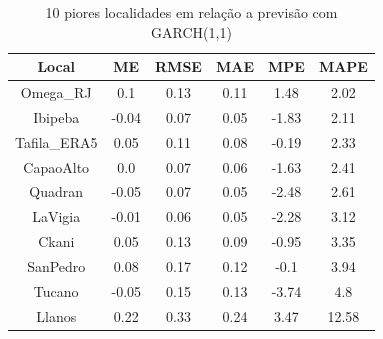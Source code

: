 \documentclass[
	12pt,				%
	openright,			%
	oneside,			%
	a4paper,			%
	english,			%
	french,				%
	spanish,			%
	brazil				%
	]{abntex2}
\begin{document}
\begin{table}[h]
\centering
\begin{tabular}{ |c|c|c|c|c|c| } 
\hline
\textbf{Local}&\textbf{ME}&\textbf{RMSE}&\textbf{MAE}&\textbf{MPE}&\textbf{MAPE}\\
\hline
Omega\_RJ&0.1&0.13&0.11&1.48&2.02\\
\hline
Ibipeba&-0.04&0.07&0.05&-1.83&2.11\\
\hline
Tafila\_ERA5&0.05&0.11&0.08&-0.19&2.33\\
\hline
CapaoAlto&0.0&0.07&0.06&-1.63&2.41\\
\hline
Quadran&-0.05&0.07&0.05&-2.48&2.61\\
\hline
LaVigia&-0.01&0.06&0.05&-2.28&3.12\\
\hline
Ckani&0.05&0.13&0.09&-0.95&3.35\\
\hline
SanPedro&0.08&0.17&0.12&-0.1&3.94\\
\hline
Tucano&-0.05&0.15&0.13&-3.74&4.8\\
\hline
Llanos&0.22&0.33&0.24&3.47&12.58\\
\hline
\end{tabular}
\caption{10 piores localidades em relação a previsão com GARCH(1,1)}
\end{table}
\end{document}
